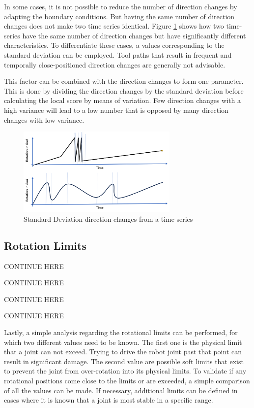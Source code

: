 In some cases, it is not possible to reduce the number of direction changes by adapting the boundary conditions. But having the same number of direction changes does not make two time series identical. Figure \ref{dirchangeSTD} shows how two time-series have the same number of direction changes but have significantly different characteristics. To differentiate these cases, a values corresponding to the standard deviation can be employed. Tool paths that result in frequent and temporally close-positioned direction changes are generally not advisable. 

\newpage
This factor can be combined with the direction changes to form one parameter. This is done by dividing the direction changes by the standard deviation before calculating the local score by means of variation. Few direction changes with a high variance will lead to a low number that is opposed by many direction changes with low variance.

\begin{figure}[H]
	\centerline{\includegraphics[width=0.7\textwidth]{figures/DirSTD.png}}
	\caption{Standard Deviation direction changes from a time series}
	\label{dirchangeSTD}
\end{figure}

\subsection{Rotation Limits}

CONTINUE HERE

CONTINUE HERE

CONTINUE HERE

CONTINUE HERE




Lastly, a simple analysis regarding the rotational limits can be performed, for which two different values need to be known. The first one is the physical limit that a joint can not exceed. Trying to drive the robot joint past that point can result in significant damage. The second value are possible soft limits that exist to prevent the joint from over-rotation into its physical limits. To validate if any rotational positions come close to the limits or are exceeded, a simple comparison of all the values can be made. If necessary, additional limits can be defined in cases where it is known that a joint is most stable in a specific range.  

